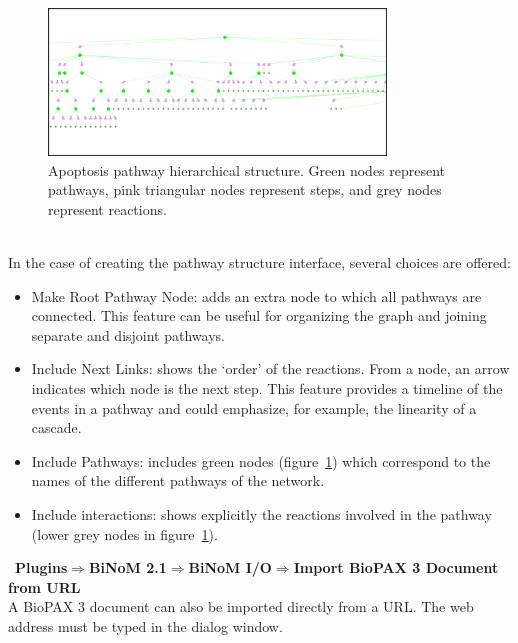 \begin{figure}
\centering
\includegraphics[width=0.8\textwidth]{graphics/Apoptosis_pathway_hierarchical_structure}
\caption{Apoptosis pathway hierarchical structure. Green nodes represent
pathways, pink triangular nodes represent steps, and grey nodes represent
reactions.}
\label{Apoptosis_pathway_hierarchical_structure}
\end{figure}
\\In the case of creating the pathway structure interface, several choices are offered:
\begin{itemize}
\item Make Root Pathway Node: adds an extra node to which all pathways are connected. This feature can be useful for organizing the graph and joining separate and disjoint pathways.
\item Include Next Links: shows the ‘order’ of the reactions. From a node, an arrow indicates which node is the next step. This feature provides a timeline of the events in a pathway and could emphasize, for example, the linearity of a cascade.
\item Include Pathways: includes green nodes (figure~\ref{Apoptosis_pathway_hierarchical_structure}) which correspond to the names of the different pathways of the network.
\item Include interactions: shows explicitly the reactions involved in the pathway (lower grey nodes in figure~\ref{Apoptosis_pathway_hierarchical_structure}).
\end{itemize}\
\textbf{Plugins$\Rightarrow$BiNoM 2.1$\Rightarrow$BiNoM I/O$\Rightarrow$Import BioPAX 3 Document from URL}\\
A BioPAX 3 document can also be imported directly from a URL. The web address must be typed in the dialog window.



